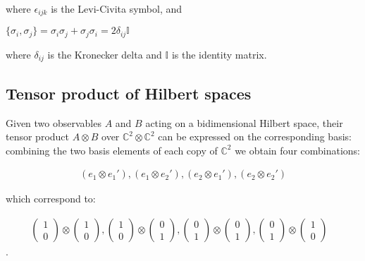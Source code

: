 \documentclass{Configuration_Files/PoliMi3i_thesis}
\begin{document}
where $\epsilon_{ijk}$ is the Levi-Civita symbol, and \newline


\begin{center}
	$\{\sigma_i, \sigma_j\} = \sigma_i \sigma_j + \sigma_j \sigma_i 
	= 2 \delta_{ij}\mathbb{I}$
\end{center}

where $ \delta_{ij} $ is the Kronecker delta and $\mathbb{I}$ is the identity matrix.


\subsection{Tensor product of Hilbert spaces}

Given two observables $A$ and $B$ acting on a bidimensional Hilbert space, their tensor product $A \otimes B$ over $\mathbb{C}^2 \otimes \mathbb{C}^2$ can be expressed on the corresponding basis: combining the two basis elements of each copy of $\mathbb{C}^2$ we  obtain four combinations:

\[\begin{array}{ccc}
	(e_1 \otimes e_1'), 
	(e_1 \otimes e_2'),
	(e_2 \otimes e_1'),
	(e_2 \otimes e_2')
\end{array}\]

which correspond to:

\[
\begin{array}{ccc}
	\begin{pmatrix}
		1 \\
		0  
	\end{pmatrix} 
	\otimes
	\begin{pmatrix}
		1  \\
		0 
	\end{pmatrix} ,
	
	\begin{pmatrix}
		1 \\
		0  
	\end{pmatrix} 
	\otimes
	\begin{pmatrix}
		0  \\
		1 
	\end{pmatrix} ,
	
	\begin{pmatrix}
		0 \\
		1  
	\end{pmatrix} 
	\otimes
	\begin{pmatrix}
		0  \\
		1 
	\end{pmatrix} ,
	
	\begin{pmatrix}
		0 \\
		1  
	\end{pmatrix} 
	\otimes
	\begin{pmatrix}
		1  \\
		0 
	\end{pmatrix} &
\end{array}
\].
\end{document}
